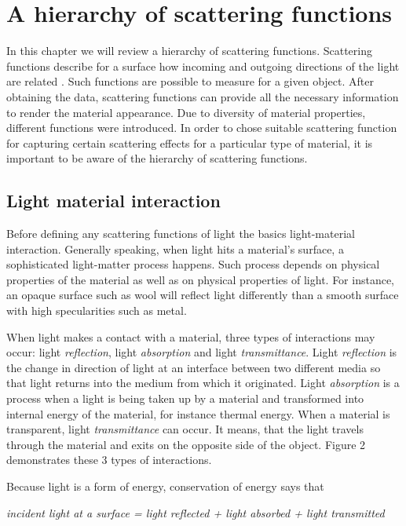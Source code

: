 \chapter{A hierarchy of scattering functions}
\label{chapter:appearance}

In this chapter we will review a hierarchy of scattering functions. 
Scattering functions describe for a surface how incoming and outgoing directions of the light are related \cite{dong}.
Such functions are possible to measure for a given object.
After obtaining the data, scattering functions can provide all the necessary information to render the material appearance. 
Due to diversity of material properties, different functions were introduced.  
In order to chose suitable scattering function for capturing certain scattering effects for a particular type of material,
it is important to be aware of the hierarchy of scattering functions.

	
\section{Light material interaction}
\label{section:light}	
Before defining any scattering functions of light the basics light-material interaction.
Generally speaking, when light hits a material's surface, a sophisticated light-matter process happens.
Such process depends on physical properties of the material as well as on physical properties of light\cite{wynn}. 
For instance, an opaque surface such as wool will reflect light differently than a smooth surface with high specularities such as metal. 

 When light makes a contact with a material, three types of interactions may occur: light \emph{reflection}, light \emph{absorption} and light \emph{transmittance}. 
 Light \emph{reflection} is the change in direction of light at an interface between two different media so that light returns into the medium from which it originated.
 Light \emph{absorption} is a process when a light is being taken up by a material and transformed into internal energy of the material, for instance thermal energy.
 When a material is transparent, light \emph{transmittance} can occur.
 It means, that the light travels through the material and exits on the opposite side of the object. 
  Figure 2 demonstrates these 3 types of interactions.
  
 Because light is a form of energy, conservation of energy says that \cite{wynn}
 \begin{center} 
\emph{incident light at a surface = light reflected + light absorbed + light transmitted}
 \end{center}
 


